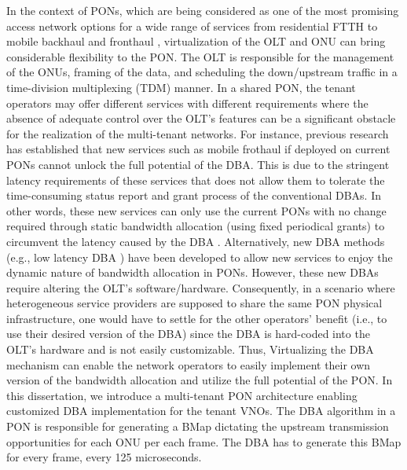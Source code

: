 In the context of \acp{PON}, which are being considered as one of the most promising access network options for a wide range of services from residential \ac{FTTH} to mobile backhaul and fronthaul \cite{7592399}, virtualization of the \ac{OLT} and ONU can bring considerable flexibility to the PON. The \ac{OLT} is responsible for the management of the ONUs, framing of the data, and scheduling the down/upstream traffic in a time-division multiplexing (TDM) manner. In a shared \ac{PON}, the tenant operators may offer different services with different requirements where the absence of adequate control over the \ac{OLT}'s features can be a significant obstacle for the realization of the multi-tenant networks. 
For instance, previous research \cite{6886953} has established that new services such as mobile frothaul if deployed on current \acp{PON} cannot unlock the full potential of the \ac{DBA}. This is due to the stringent latency requirements of these services that does not allow them to tolerate the time-consuming status report and grant process of the conventional \acp{DBA}. In other words, these new services can only use the current \acp{PON} with no change required through static bandwidth allocation (using fixed periodical grants) to circumvent the latency caused by the \ac{DBA} \cite{tayq_fronthaul_2017}. Alternatively, new \ac{DBA} methods (e.g., low latency \ac{DBA} \cite{7937022}) have been developed to allow new services to enjoy the dynamic nature of bandwidth allocation in \acp{PON}. However, these new \acp{DBA} require altering the \ac{OLT}'s software/hardware. Consequently, in a scenario where heterogeneous service providers are supposed to share the same \ac{PON} physical infrastructure, one would have to settle for the other operators' benefit (i.e., to use their desired version of the \ac{DBA}) since the \ac{DBA} is hard-coded into the \ac{OLT}'s hardware and is not easily customizable. Thus, Virtualizing the \ac{DBA} mechanism can enable the network operators to easily implement their own version of the bandwidth allocation and utilize the full potential of the \ac{PON}.
In this dissertation, we introduce a multi-tenant \ac{PON} architecture enabling customized \ac{DBA} implementation for the tenant \acp{VNO}. The \ac{DBA} algorithm in a \ac{PON} is responsible for generating a \ac{BMap} dictating the upstream transmission opportunities for each ONU per each frame. The \ac{DBA} has to generate this \ac{BMap} for every frame, every 125 microseconds.

